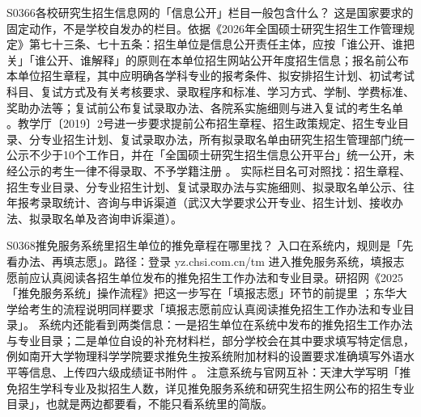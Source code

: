 \begin{qa}{S0366}{各校研究生招生信息网的「信息公开」栏目一般包含什么？}
这是国家要求的固定动作，不是学校自发办的栏目。依据《2026年全国硕士研究生招生工作管理规定》第七十三条、七十五条：招生单位是信息公开责任主体，应按「谁公开、谁把关」「谁公开、谁解释」的原则在本单位招生网站公开年度招生信息；报名前公布本单位招生章程，其中应明确各学科专业的报考条件、拟安排招生计划、初试考试科目、复试方式及有关考核要求、录取程序和标准、学习方式、学制、学费标准、奖助办法等；复试前公布复试录取办法、各院系实施细则与进入复试的考生名单 。教学厅〔2019〕2号进一步要求提前公布招生章程、招生政策规定、招生专业目录、分专业招生计划、复试录取办法，所有拟录取名单由研究生招生管理部门统一公示不少于10个工作日，并在「全国硕士研究生招生信息公开平台」统一公开，未经公示的考生一律不得录取、不予学籍注册 。
实际栏目名可对照找：招生章程、招生专业目录、分专业招生计划、复试录取办法与实施细则、拟录取名单公示、往年报考录取统计、咨询与申诉渠道（武汉大学要求公开专业、招生计划、接收办法、拟录取名单及咨询申诉渠道）。
\end{qa}

\begin{qa}{S0368}{推免服务系统里招生单位的推免章程在哪里找？}
入口在系统内，规则是「先看办法、再填志愿」。路径：登录 yz.chsi.com.cn/tm 进入推免服务系统，填报志愿前应认真阅读各招生单位发布的推免招生工作办法和专业目录。研招网《2025「推免服务系统」操作流程》把这一步写在「填报志愿」环节的前提里 ；东华大学给考生的流程说明同样要求「填报志愿前应认真阅读推免招生工作办法和专业目录」。
系统内还能看到两类信息：一是招生单位在系统中发布的推免招生工作办法与专业目录；二是单位自设的补充材料栏，部分学校会在其中要求填写特定信息，例如南开大学物理科学学院要求推免生按系统附加材料的设置要求准确填写外语水平等信息、上传四六级成绩证书附件 。
注意系统与官网互补：天津大学写明「推免招生学科专业及拟招生人数，详见推免服务系统和研究生招生网公布的招生专业目录」，也就是两边都要看，不能只看系统里的简版。
\end{qa}

